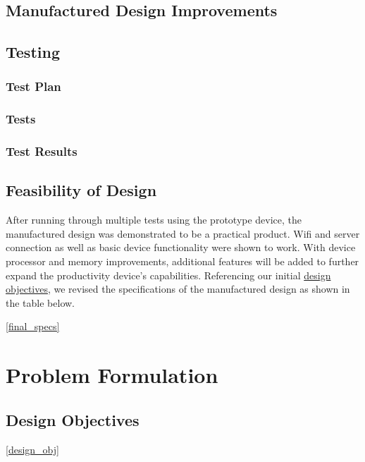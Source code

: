 \documentclass{article}
\begin{document}
\subsection{Manufactured Design Improvements} \label{improvments}


\newpage

\subsection{Testing}
\subsubsection{Test Plan}


\newpage

\subsubsection{Tests}


\subsubsection{Test Results}


\subsection{Feasibility of Design}
After running through multiple tests using the prototype device, the manufactured design was demonstrated to be a practical product. Wifi and server connection as well as basic device functionality were shown to work. With device processor and memory improvements, additional features will be added to further expand the productivity device's capabilities.
Referencing our initial \href{design_obj}{design objectives}, we revised the specifications of the manufactured design as shown in the table below.

\ref{final_specs}

\newpage
\appendix
\appendixpage

\section{Problem Formulation}
\subsection{Design Objectives} \ref{design_obj}


\end{document}
